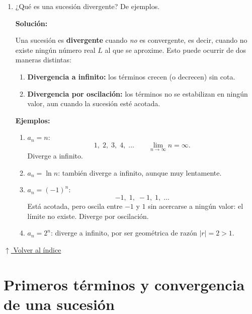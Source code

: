 \documentclass[12pt]{article}
\newcommand{\solucion}{%
    \vspace{0.8em}%
    \textbf{Solución:}%
}
\newcommand{\volverindice}{%
    \vspace{1em}%
    \begin{flushright}%
        \hyperlink{indice}{\small $\uparrow$ Volver al índice}%
    \end{flushright}%
}
\begin{document}
\begin{enumerate}[label=\alph*.-]
\begin{enumerate}[label=\roman*.-]
    \end{enumerate}

				\newpage
    \item ¿Qué es una sucesión divergente? De ejemplos.

    \solucion

    Una sucesión es \textbf{divergente} cuando \emph{no} es convergente, es
    decir, cuando no existe ningún número real $L$ al que se aproxime. Esto
    puede ocurrir de dos maneras distintas:

    \begin{enumerate}[label=\roman*.-]

        \item \textbf{Divergencia a infinito:} los términos crecen (o decrecen)
        sin cota.

        \item \textbf{Divergencia por oscilación:} los términos no se estabilizan
        en ningún valor, aun cuando la sucesión esté acotada.

    \end{enumerate}

    \textbf{Ejemplos:}

    \begin{enumerate}[label=\roman*.-]

        \item $a_n=n$:
        \[
        1,\;2,\;3,\;4,\;\dots
        \qquad
        \lim_{n\to\infty}n=\infty .
        \]
        Diverge a infinito.

        \item $a_n=\ln n$: también diverge a infinito, aunque muy lentamente.

        \item $a_n=(-1)^n$:
        \[
        -1,\;1,\;-1,\;1,\;\dots
        \]
        Está acotada, pero oscila entre $-1$ y $1$ sin acercarse a ningún valor:
        el límite no existe. Diverge por oscilación.

        \item $a_n=2^n$: diverge a infinito, por ser geométrica de razón
        $|r|=2>1$.

    \end{enumerate}

\end{enumerate}

\volverindice
\newpage


\section{Primeros términos y convergencia de una sucesión}
\end{document}
